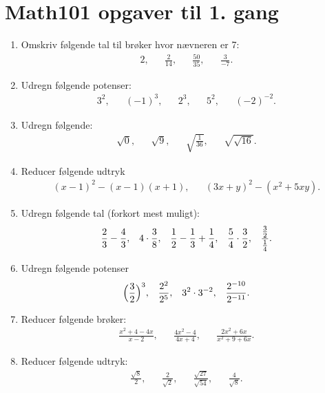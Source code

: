 \section{Math101 opgaver til 1. gang}

\begin{enumerate}
\item Omskriv følgende tal til brøker hvor nævneren er 7:
\begin{align*}
2,&& \frac{2}{14},&&  \frac{50}{35},&& \frac{3}{-7}.%
\end{align*}

\item Udregn følgende potenser:
\begin{align*}
3^2,&& (-1)^{3},&& 2^3,&& 5^2,&& (-2)^{-2}.
\end{align*}

\item Udregn følgende:
\begin{align*}
\sqrt{0},&& \sqrt{9},&& \sqrt{\frac{1}{36}},&& \sqrt{\sqrt{16}}.
\end{align*}
\item Reducer følgende udtryk
\begin{align*}
(x-1)^2-(x-1)(x+1),&& (3x+y)^2-(x^2+5xy).
\end{align*}

\item Udregn følgende tal (forkort mest muligt):
\begin{align*}
\frac{2}{3}-\frac{4}{3},&&4\cdot\frac{3}{8},&& \frac{1}{2}-\frac{1}{3}+\frac{1}{4},&& \frac{5}{4}\cdot \frac{3}{2},&& \frac{\frac{3}{2}}{\frac{1}{4}}.
\end{align*}

\item Udregn følgende potenser
\begin{align*}
\Big(\frac{3}{2}\Big)^3,&& \frac{2^2}{2^5},&& 3^2\cdot 3^{-2},&& \frac{2^{-10}}{2^{-11}}.
\end{align*}

\item Reducer følgende brøker:
\begin{align*}
\frac{x^2+4-4x}{x-2},&& \frac{4x^2-4}{4x+4},&&\frac{2x^2+6x}{x^2+9+6x}.
\end{align*}

\item Reducer følgende udtryk:
\begin{align*}
\frac{\sqrt{8}}{2},&& \frac{2}{\sqrt{2}},&& \frac{\sqrt{27}}{\sqrt{54}},&& \frac{4}{\sqrt{8}}.
\end{align*}


\end{enumerate}
